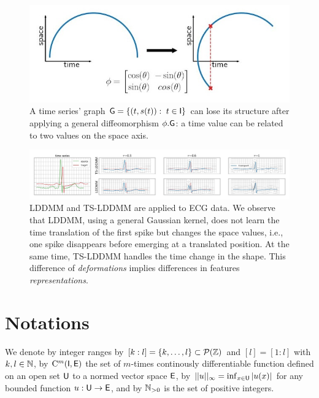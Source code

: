 \begin{figure}[t]
  \centering
  \includegraphics[width=0.7\linewidth]{"./pictures/diffeo.jpeg"}
  
  \caption{A time series' graph $\mathsf{G}=\{(t,s(t)): \; t\in\mathsf{I}\} $ can lose its structure after applying a general diffeomorphism $\phi.\mathsf{G}$: a time value can be related to two values on the space axis.}
  \label{fig:diffeo}
  
\end{figure}

\begin{figure}[t]
  \centering
  \includegraphics[width=\linewidth]{"./pictures/transport.jpeg"}
  
  \caption{LDDMM and TS-LDDMM are applied to ECG data.
  We observe that LDDMM, using a general Gaussian kernel, does not learn the time translation of the first spike but changes the space values, i.e., one spike disappears before emerging at a translated position. At the same time, TS-LDDMM handles the time change in the shape.
  This difference of \textit{deformations} implies differences in features \textit{representations}.   }
  \label{fig:transport}
  
\end{figure}

  \vspace{-1ex}
\section{Notations}
We denote by integer ranges by $[k:l]=\{k,\ldots,l\}\subset \mathcal{P}(\mathbb{Z})$ and $ [l]=[1:l]$ with $k,l\in \mathbb{N}$,
by $\mathrm{C}^m(\mathsf{I},\mathsf{E})$ the set of $m$-times continously differentiable function defined on an open set $\mathsf{U}$ to a normed vector space $\mathsf{E}$,
 by $||u||_\infty=\inf_{x\in \mathsf{U}} |u(x)| $ for any bounded function $u:\mathsf{U} \to \mathsf{E}$,
and by $\mathbb{N}_{>0}$ is the set of positive integers. 


